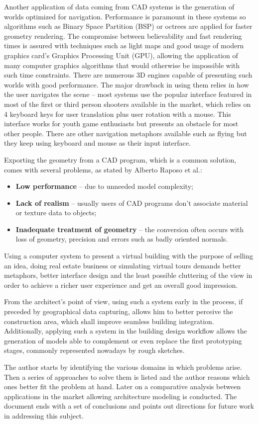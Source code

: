 Another application of data coming from CAD systems is the generation of worlds optimized for navigation.
Performance is paramount in these systems so algorithms such as Binary Space Partition (BSP)
or octrees are applied for faster geometry rendering.
The compromise between believability and fast rendering times is assured with techniques such as
light maps and good usage of modern graphics card's Graphics Processing Unit (GPU),
allowing the application of many computer graphics algorithms that would otherwise be impossible
with such time constraints.
There are numerous 3D engines capable of presenting such worlds with good performance.
The major drawback in using them relies in how the user navigates the scene --
most systems use the popular interface featured in most of the first or third person shooters
available in the market,
which relies on 4 keyboard keys for user translation plus user rotation with a mouse.
This interface works for youth game enthusiasts but presents an obstacle for most other people.
There are other navigation metaphors available such as flying but they keep using keyboard and mouse
as their input interface.

Exporting the geometry from a CAD program, which is a common solution, comes with several problems,
as stated by Alberto Raposo et al.\cite{CADVR06}:
\begin{itemize}
	\item \textbf{Low performance} -- due to unneeded model complexity;
	\item \textbf{Lack of realism} -- usually users of CAD programs don't associate material
	or texture data to objects;
	\item \textbf{Inadequate treatment of geometry} -- the conversion often occurs with loss of
	geometry, precision and errors such as badly oriented normals.
\end{itemize}

Using a computer system to present a virtual building with the purpose of selling an idea,
doing real estate business or simulating virtual tours demands better metaphors,
better interface design and the least possible cluttering of the view in order
to achieve a richer user experience and get an overall good impression.

From the architect's point of view, using such a system early in the process,
if preceded by geographical data capturing,
allows him to better perceive the construction area, which shall improve seamless building integration.
Additionally, applying such a system in the building design workflow allows the generation
of models able to complement or even replace the first prototyping stages,
commonly represented nowadays by rough sketches.

The author starts by identifying the various domains in which problems arise.
Then a series of approaches to solve them is listed and the author reasons which ones better fit
the problem at hand.
Later on a comparative analysis between applications in the market allowing architecture modeling is conducted.
The document ends with a set of conclusions and points out directions for future work in
addressing this subject.
